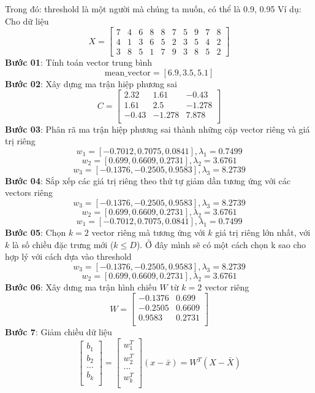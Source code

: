 \documentclass{article}
\begin{document}
	Trong đó: threshold là một người mà chúng ta muốn, có thể là 0.9, 0.95\newline
	Ví dụ: Cho dữ liệu \newline
	$$
	X = \begin{bmatrix}
		7 & 4& 6& 8& 8 &7& 5& 9 &7& 8 \\
		4 &1 &3& 6& 5& 2& 3& 5& 4 &2\\
		3 &8 &5 &1&7& 9& 3& 8& 5& 2
	\end{bmatrix}
	$$
	\textbf{Bước 01}: Tính toán vector trung bình
	$$\text{mean\_vector} = [6.9, 3.5, 5.1]$$
	\textbf{Bước 02}: Xây dựng ma trận hiệp phương sai
	$$
	C = \begin{bmatrix}
		2.32 & 1.61 & -0.43\\
		1.61 & 2.5 & -1.278\\
		-0.43 & -1.278 & 7.878\\
	\end{bmatrix}
	$$
	\textbf{Bước 03}: Phân rã ma trận hiệp phương sai thành những cặp vector riêng và giá trị riêng
	$$w_1 = [-0.7012, 0.7075, 0.0841], \lambda_1 = 0.7499$$
	$$w_2 = [0.699, 0.6609, 0.2731], \lambda_2 = 3.6761$$
	$$w_3 = [-0.1376, -0.2505, 0.9583], \lambda_3 = 8.2739$$
	\textbf{Bước 04}: Sắp xếp các giá trị riêng theo thứ tự giảm dần tương ứng với các vectors riêng 
	$$w_3 = [-0.1376, -0.2505, 0.9583], \lambda_3 = 8.2739$$
	$$w_2 = [0.699, 0.6609, 0.2731], \lambda_2 = 3.6761$$
	$$w_1 = [-0.7012, 0.7075, 0.0841], \lambda_1 = 0.7499$$
	\textbf{Bước 05}: Chọn $k=2$ vector riêng mà tương ứng với $k$ giá trị riêng lớn nhất, với $k$ là số chiều đặc trưng mới  ($k \leq D$). Ở đây mình sẽ có một cách chọn k sao cho hợp lý với cách dựa vào threshold
	$$w_3 = [-0.1376, -0.2505, 0.9583], \lambda_3 = 8.2739$$
	$$w_2 = [0.699, 0.6609, 0.2731], \lambda_2 = 3.6761$$
	\textbf{Bước 06}: Xây dưng ma trận hình chiếu $W$ từ $k=2$ vector riêng 
	$$W = 
	\begin{bmatrix}
		-0.1376 & 0.699\\
		-0.2505 & 0.6609\\
		0.9583 & 0.2731\\
	\end{bmatrix}
	$$
	\textbf{Bước 7}: Giảm chiều dữ liệu
	$$
	\begin{bmatrix}
		b_1 \\
		b_2 \\
		... \\
		b_k \\
	\end{bmatrix} = 
	\begin{bmatrix}
		w_1^T \\
		w_2^T \\
		... \\
		w_k^T \\
	\end{bmatrix}(x- \bar{x}) = W^T(X- \bar{X})
	$$
	
\end{document}
